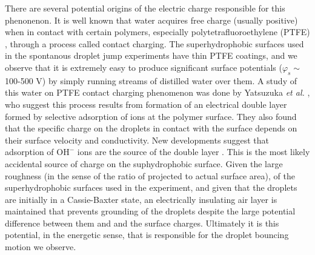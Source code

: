 \documentclass[12pt,a4paper,oneside]{book}
\begin{document}
There are several potential origins of the electric charge responsible for this phenonenon. It is well known that water acquires free charge (usually positive) when in contact with certain polymers, especially polytetrafluoroethylene (PTFE) \cite{langmuir_surface_1938}, through a process called contact charging. The superhydrophobic surfaces used in the spontanous droplet jump experiments have thin PTFE coatings, and we observe that it is extremely easy to produce significant surface potentials ($\varphi_s \sim$ 100-500 V) by simply running streams of distilled water over them. A study of this water on PTFE contact charging phenomenon was done by Yatsuzuka \emph{et al.} \cite{yatsuzuka_electrification_1994}, who suggest this process results from formation of an electrical double layer formed by selective adsorption of ions at the polymer surface. They also found that the specific charge on the droplets in contact with the surface depends on their surface velocity and conductivity. New developments suggest that adsorption of $\mbox{OH}^-$ ions are the source of the double layer \cite{beattie_intrinsic_2006} \cite{strazdaite_water_2015}. This is the most likely accidental source of charge on the suphydrophobic surface. Given the large roughness (in the sense of the ratio of projected to actual surface area), of the superhydrophobic surfaces used in the experiment, and given that the droplets are initially in a Cassie-Baxter state, an electrically insulating air layer is maintained that prevents grounding of the droplets despite the large potential difference between them and and the surface charges. Ultimately it is this potential, in the energetic sense, that is responsible for the droplet bouncing motion we observe. 
\end{document}
